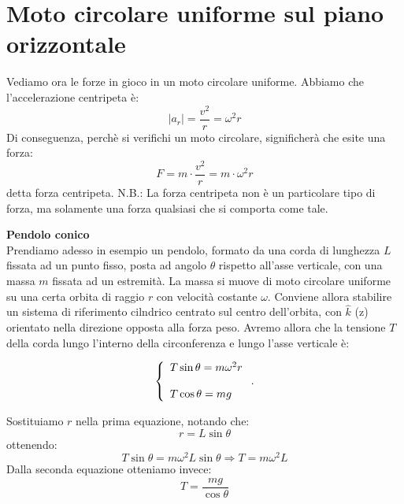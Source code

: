 \documentclass[a4paper,12pt]{article}
\begin{document}
\section{Moto circolare uniforme sul piano orizzontale}
Vediamo ora le forze in gioco in un moto circolare uniforme. Abbiamo che l'accelerazione centripeta è:
$$ |a_r| = \frac{v^2}{r} = \omega^2 r$$
Di conseguenza, perchè si verifichi un moto circolare, significherà che esite una forza:
$$ F = m \cdot \frac{v^2}{r} = m \cdot \omega^2 r$$
detta forza centripeta. N.B.: La forza centripeta non è un particolare tipo di forza, ma solamente una forza qualsiasi
che si comporta come tale.
\par\smallskip
\textbf{Pendolo conico} \\
Prendiamo adesso in esempio un pendolo, formato da una corda di lunghezza $L$ fissata ad un punto fisso, posta
ad angolo $\theta$ rispetto all'asse verticale, con una massa $m$ fissata ad un estremità. La massa si muove di
moto circolare uniforme su una certa orbita di raggio $r$ con velocità costante $\omega$. Conviene allora
stabilire un sistema di riferimento cilndrico centrato sul centro dell'orbita, con $\hat{k}$ (z) orientato nella direzione
opposta alla forza peso. Avremo allora che la tensione $T$ della corda lungo l'interno della circonferenza e lungo
l'asse verticale è:

$$
\begin{aligned}
\left\{\begin{array}{l}
  T\sin{\theta} = m\omega^2r\cr \\
  T\cos{\theta = mg}
\end{array}\right..
\end{aligned}
$$

Sostituiamo $r$ nella prima equazione, notando che:
$$ r = L\sin{\theta} $$
ottenendo:
$$ T\sin{\theta} = m\omega^2L\sin{\theta} \Rightarrow T = m\omega^2L $$
Dalla seconda equazione otteniamo invece:
$$ T = \frac{mg}{\cos{\theta}} $$
\end{document}
